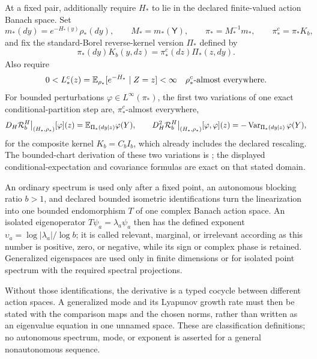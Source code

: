 At a fixed pair, additionally require $H_*$ to lie in the declared
finite-valued action Banach space.  Set
\begin{equation}
m_*(dy)=e^{-H_*(y)}\rho_*(dy),\qquad
M_*=m_*(\mathsf Y),\qquad
\pi_*=M_*^{-1}m_*,\qquad
\pi_*^c=\pi_*K_b,
\label{eq:rg-fixed-normalized-reverse-data}
\end{equation}
and fix the standard-Borel reverse-kernel version \(\Pi_*\) defined by
\begin{equation}
\pi_*(dy)K_b(y,dz)=\pi_*^c(dz)\Pi_*(z,dy).
\label{eq:rg-fixed-normalized-reverse-kernel}
\end{equation}
Also require
\begin{equation}
0<L_*^c(z)=\mathbb E_{\rho_*}[e^{-H_*}\mid Z=z]<\infty
\quad \rho_*^c\text{-almost everywhere}.
\label{eq:rg-linearization-positive-likelihood}
\end{equation}
For bounded perturbations
$\varphi\in L^\infty(\pi_*)$, the first two variations of one exact
conditional-partition step are, \(\pi_*^c\)-almost everywhere,
\begin{equation}
D_H\mathcal R_b^H\big|_{(H_*,\rho_*)}[\varphi](z)
=\mathbb E_{\Pi_*(dy\mid z)}\varphi(Y),
\qquad
D_H^2\mathcal R_b^H\big|_{(H_*,\rho_*)}[\varphi,\varphi](z)
=-\operatorname{Var}_{\Pi_*(dy\mid z)}\varphi(Y),
\label{eq:rg-linearized-action}
\end{equation}
for the composite kernel \(K_b=C_bI_b\), which already includes the declared
rescaling.  The bounded-chart derivation of these two variations is
; the displayed
conditional-expectation and covariance formulas are exact on that stated
domain. 

An ordinary spectrum is used only after a fixed point, an autonomous blocking
ratio $b>1$, and declared bounded isometric identifications turn the
linearization into one bounded endomorphism $T$ of one complex Banach action
space.  An isolated eigenoperator $T\psi_a=\lambda_a\psi_a$ then has the
defined exponent $\upsilon_a=\log|\lambda_a|/\log b$; it is called relevant,
marginal, or irrelevant according as this number is positive, zero, or
negative, while its sign or complex phase is retained.  Generalized
eigenspaces are used only in finite dimensions or for isolated point spectrum
with the required spectral projections.

Without those identifications, the derivative is a typed cocycle between
different action spaces.  A generalized mode and its Lyapunov growth rate
must then be stated with the comparison maps and the chosen norms, rather than
written as an eigenvalue equation in one unnamed space.  These are
classification definitions; no autonomous spectrum, mode, or exponent is
asserted for a general nonautonomous sequence. 

